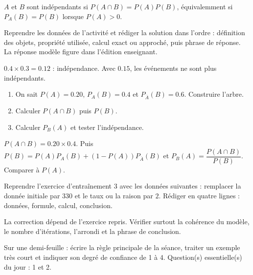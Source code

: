 \begin{summary}$A$ et $B$ sont indépendants si $P(A\cap B)=P(A)P(B)$, équivalemment si $P_A(B)=P(B)$ lorsque $P(A)>0$.\end{summary}

\begin{example}
Reprendre les données de l'activité et rédiger la solution dans l'ordre : définition des objets, propriété utilisée, calcul exact ou approché, puis phrase de réponse. La réponse modèle figure dans l'édition enseignant.
\end{example}
\begin{solution}$\num{0,4}\times\num{0,3}=\num{0,12}$ : indépendance. Avec $\num{0,15}$, les événements ne sont plus indépendants.\end{solution}

\begin{exercise}[essentiel]
\begin{enumerate}\item On sait $P(A)=\num{0,20}$, $P_A(B)=\num{0,4}$ et $P_{\overline A}(B)=\num{0,6}$. Construire l'arbre.\item Calculer $P(A\cap B)$ puis $P(B)$.\item Calculer $P_B(A)$ et tester l'indépendance.\end{enumerate}
\end{exercise}
\begin{solution}$P(A\cap B)=\num{0,20}\times\num{0,4}$. Puis $P(B)=P(A)P_A(B)+(1-P(A))P_{\overline A}(B)$ et $P_B(A)=\dfrac{P(A\cap B)}{P(B)}$. Comparer à $P(A)$.\end{solution}


\begin{homework}Reprendre l'exercice d'entraînement 3 avec les données suivantes : remplacer la donnée initiale par $330$ et le taux ou la raison par $2$. Rédiger en quatre lignes : données, formule, calcul, conclusion.\end{homework}
\begin{solution}La correction dépend de l'exercice repris. Vérifier surtout la cohérence du modèle, le nombre d'itérations, l'arrondi et la phrase de conclusion.\end{solution}

\begin{exitticket}[3 minutes]Sur une demi-feuille : écrire la règle principale de la séance, traiter un exemple très court et indiquer son degré de confiance de 1 à 4. Question(s) essentielle(s) du jour : 1 et 2.\end{exitticket}

